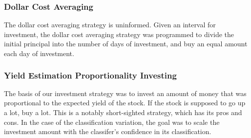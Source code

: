 \documentclass[12pt]{article}
\begin{document}
\subsubsection{Dollar Cost Averaging}
The dollar cost averaging strategy is uninformed. Given an interval for investment, the dollar cost averaging strategy was programmed to divide the initial principal into the number of days of investment, and buy an equal amount each day of investment.

\subsubsection{Yield Estimation Proportionality Investing}
The basis of our investment strategy was to invest an amount of money that was proportional to the expected yield of the stock. If the stock is supposed to go up a lot, buy a lot. This is a notably short-sighted strategy, which has its pros and cons. In the case of the classification variation, the goal was to scale the investment amount with the classifer's confidence in its classification. 
\end{document}
